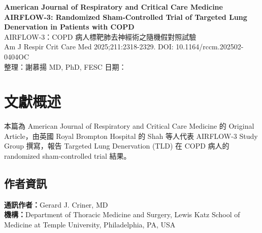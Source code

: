 \documentclass[12pt,a4paper]{article}
\begin{document}
\begin{center}
{\LARGE\bfseries\textcolor{emergency_red}{American Journal of Respiratory and Critical Care Medicine}}\\[0.5cm]
{\Large\textbf{AIRFLOW-3: Randomized Sham-Controlled Trial of Targeted Lung Denervation in Patients with COPD}}\\[0.3cm]
{\large AIRFLOW-3：COPD 病人標靶肺去神經術之隨機假對照試驗}\\[0.5cm]
{\normalsize Am J Respir Crit Care Med 2025;211:2318-2329. DOI: 10.1164/rccm.202502-0404OC}\\[0.3cm]
{\normalsize 整理：謝慕揚 MD, PhD, FESC \quad 日期：\mydate}
\end{center}


\tableofcontents
\newpage

\section{文獻概述}

本篇為 American Journal of Respiratory and Critical Care Medicine 的 Original Article，由英國 Royal Brompton Hospital 的 Shah 等人代表 AIRFLOW-3 Study Group 撰寫，報告 Targeted Lung Denervation (TLD) 在 COPD 病人的 randomized sham-controlled trial 結果。

\subsection{作者資訊}
\textbf{通訊作者：}Gerard J. Criner, MD\\
\textbf{機構：}Department of Thoracic Medicine and Surgery, Lewis Katz School of Medicine at Temple University, Philadelphia, PA, USA
\end{document}

